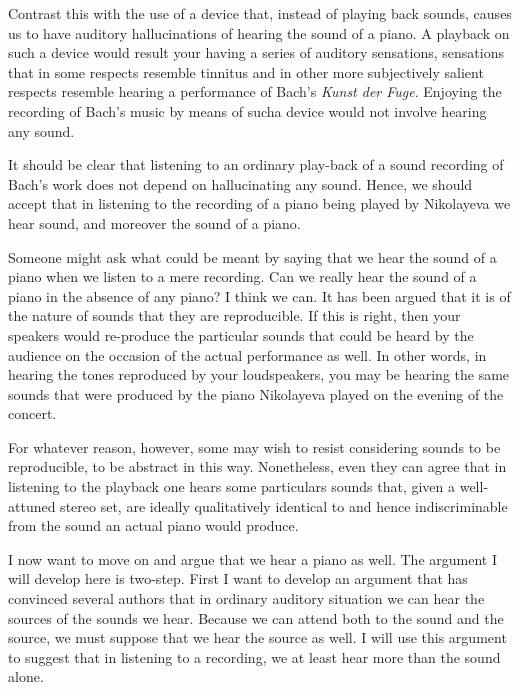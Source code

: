 \documentclass[sloppy, journal, git, bytitle, dodraft]{humapap}
\begin{document}
Contrast this with the use of a device that, instead of playing back sounds, causes us to have auditory hallucinations of hearing the sound of a piano. A playback on such a device would result your having a series of auditory sensations, sensations that in some respects resemble tinnitus and in other more subjectively salient respects resemble hearing a performance of Bach's \emph{Kunst der Fuge}. Enjoying the recording of Bach's music by means of sucha device would not involve hearing any sound. 

It should be clear that listening to an ordinary play-back of a sound recording of Bach's work does not depend on hallucinating any sound. Hence, we should accept that in listening to the recording of a piano being played by Nikolayeva we hear sound, and moreover the sound of a piano.

Someone might ask what could be meant by saying that we hear the sound of a piano when we listen to a mere recording. Can we really hear the sound of a piano in the absence of any piano? I think we can. It has been argued that it is of the nature of sounds that they are reproducible. If this is right, then your speakers would re-produce the particular sounds that could be heard by the audience on the occasion of the actual performance as well. In other words, in hearing the tones reproduced by your loudspeakers, you may be hearing the same sounds that were produced by the piano Nikolayeva played on the evening of the concert. 

For whatever reason, however, some may wish to resist considering sounds to be reproducible, to be abstract in this way. Nonetheless, even they can agree that in listening to the playback one hears some particulars sounds that, given a well-attuned stereo set, are ideally qualitatively identical to and hence indiscriminable from the sound an actual piano would produce.


\sect I now want to move on and argue that we hear a piano as well. The argument I will develop here is two-step. First I want to develop an argument that has convinced several authors that in ordinary auditory situation we can hear the sources of the sounds we hear. Because we can attend both to the sound and the source, we must suppose that we hear the source as well. I will use this argument to suggest that in listening to a recording, we at least hear more than the sound alone. 
	
\end{document}
